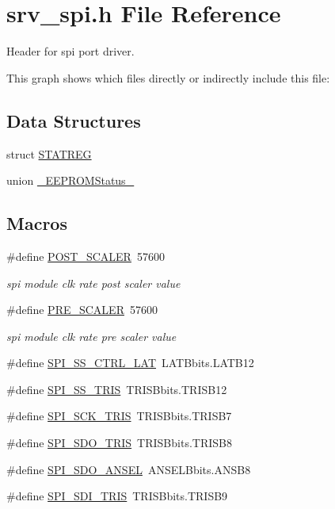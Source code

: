 \hypertarget{a00007}{\section{srv\+\_\+spi.\+h File Reference}
\label{a00007}
}


Header for spi port driver.  


This graph shows which files directly or indirectly include this file\+:
\subsection*{Data Structures}
\begin{DoxyCompactItemize}
\item 
struct \hyperlink{a00007_dc/d0c/a00783}{S\+T\+A\+T\+R\+E\+G}
\item 
union \hyperlink{a00007_d2/db1/a00070}{\+\_\+\+E\+E\+P\+R\+O\+M\+Status\+\_\+}
\end{DoxyCompactItemize}
\subsection*{Macros}
\begin{DoxyCompactItemize}
\item 
\#define \hyperlink{a00007_a5df9b14c775d6e4eab17c79a729a4dbf}{P\+O\+S\+T\+\_\+\+S\+C\+A\+L\+E\+R}~57600
\begin{DoxyCompactList}\small\item\em spi module clk rate post scaler value \end{DoxyCompactList}\item 
\#define \hyperlink{a00007_a5c1fd7fa207a92f0b4b78d39bbd2f34b}{P\+R\+E\+\_\+\+S\+C\+A\+L\+E\+R}~57600
\begin{DoxyCompactList}\small\item\em spi module clk rate pre scaler value \end{DoxyCompactList}\item 
\#define \hyperlink{a00007_aa8b53e04161d178ebd9c01edf1584039}{S\+P\+I\+\_\+\+S\+S\+\_\+\+C\+T\+R\+L\+\_\+\+L\+A\+T}~L\+A\+T\+Bbits.\+L\+A\+T\+B12
\item 
\#define \hyperlink{a00007_a1424f86a2482cfbcf68f709ce542e262}{S\+P\+I\+\_\+\+S\+S\+\_\+\+T\+R\+I\+S}~T\+R\+I\+S\+Bbits.\+T\+R\+I\+S\+B12
\item 
\#define \hyperlink{a00007_a98c4bd0ee0f76eb205e874355bf9cd33}{S\+P\+I\+\_\+\+S\+C\+K\+\_\+\+T\+R\+I\+S}~T\+R\+I\+S\+Bbits.\+T\+R\+I\+S\+B7
\item 
\#define \hyperlink{a00007_aa171067a2f57d1555ab4449c78847c72}{S\+P\+I\+\_\+\+S\+D\+O\+\_\+\+T\+R\+I\+S}~T\+R\+I\+S\+Bbits.\+T\+R\+I\+S\+B8
\item 
\#define \hyperlink{a00007_a11571727bdbc21b0bfb7c701599e759b}{S\+P\+I\+\_\+\+S\+D\+O\+\_\+\+A\+N\+S\+E\+L}~A\+N\+S\+E\+L\+Bbits.\+A\+N\+S\+B8
\item 
\#define \hyperlink{a00007_a40c85fd42ffb12b326b7cb9ee48f2ffb}{S\+P\+I\+\_\+\+S\+D\+I\+\_\+\+T\+R\+I\+S}~T\+R\+I\+S\+Bbits.\+T\+R\+I\+S\+B9
\end{DoxyCompactItemize}
